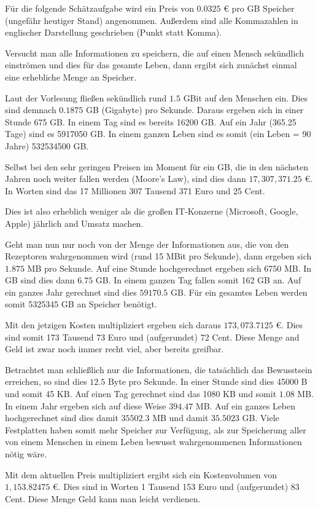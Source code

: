 \documentclass[a4paper,10pt]{scrartcl}
\begin{document}
\kopf
\renewcommand{\figurename}{Figure}


Für die folgende Schätzaufgabe wird ein Preis von $0.0325$ \euro{} pro GB Speicher (ungefähr heutiger Stand) angenommen. Außerdem sind alle Kommazahlen in englischer Darstellung geschrieben (Punkt statt Komma).


Versucht man alle Informationen zu speichern, die auf einen Mensch sekündlich einströmen und dies für das gesamte Leben, dann ergibt sich zunächst einmal eine erhebliche Menge an Speicher.

Laut der Vorlesung fließen sekündlich rund $1.5$ GBit auf den Menschen ein. Dies sind demnach $0.1875$ GB (Gigabyte) pro Sekunde. Daraus ergeben sich in einer Stunde 675 GB. In einem Tag sind es bereits 16200 GB. Auf ein Jahr (365.25 Tage) sind es 5917050 GB. In einem ganzen Leben sind es somit (ein Leben = 90 Jahre) 532534500 GB.

Selbst bei den sehr geringen Preisen im Moment für ein GB, die in den nächsten Jahren noch weiter fallen werden (Moore's Law), sind dies dann $17,307,371.25$ \euro{}. In Worten sind das 17 Millionen 307 Tausend 371 Euro und 25 Cent.

Dies ist also erheblich weniger als die großen IT-Konzerne (Microsoft, Google, Apple) jährlich and Umsatz machen.


Geht man nun nur noch von der Menge der Informationen aus, die von den Rezeptoren wahrgenommen wird (rund 15 MBit pro Sekunde), dann ergeben sich $1.875$ MB pro Sekunde. Auf eine Stunde hochgerechnet ergeben sich 6750 MB. In GB sind dies dann $6.75$ GB. In einem ganzen Tag fallen somit 162 GB an. Auf ein ganzes Jahr gerechnet sind dies $59170.5$ GB. Für ein gesamtes Leben werden somit 5325345 GB an Speicher benötigt.

Mit den jetzigen Kosten multipliziert ergeben sich daraus $173,073.7125$ \euro{}. Dies sind somit 173 Tausend 73 Euro und (aufgerundet) 72 Cent. Diese Menge and Geld ist zwar noch immer recht viel, aber bereits greifbar.


Betrachtet man schließlich nur die Informationen, die tatsächlich das Bewusstsein erreichen, so sind dies $12.5$ Byte pro Sekunde. In einer Stunde sind dies 45000 B und somit 45 KB. Auf einen Tag gerechnet sind das 1080 KB und somit $1.08$ MB. In einem Jahr ergeben sich auf diese Weise $394.47$ MB. Auf ein ganzes Leben hochgerechnet sind dies damit $35502.3$ MB und damit $35.5023$ GB. Viele Festplatten haben somit mehr Speicher zur Verfügung, als zur Speicherung aller von einem Menschen in einem Leben bewusst wahrgenommenen Informationen nötig wäre.

Mit dem aktuellen Preis multipliziert ergibt sich ein Kostenvolumen von $1,153.82475$ \euro{}. Dies sind in Worten 1 Tausend 153 Euro und (aufgerundet) 83 Cent. Diese Menge Geld kann man leicht verdienen. 
\end{document}
